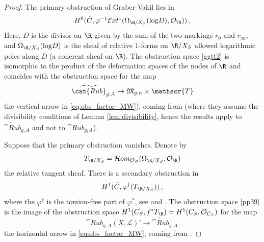 \documentclass[a4paper,12pt]{article} %
\newcommand{\MWvone}[1]{}%
\newcommand{\MWref}[1]{#1}
\newcommand{\cl}[1]{{\mathscr{#1}}}
\newcommand{\ca}[1]{{\mathcal{#1}}}
\def\log{\mathrm{log}}
\def\sheafhom{\mathcal{H}om}
\theoremstyle{definition}
\theoremstyle{plain}%
\renewcommand{\phi}{\varphi}
\newcommand{\jocomment}[1]{}
\begin{document}
\begin{proof}
The primary obstruction of Graber-Vakil lies in 
\begin{equation}\label{ggtt2}
H^0(\tilde C, \phi^{-1}\ca{E}xt^1(\Omega_{\R/X_S}(\log D), \ca O_{\R}))\, .
\end{equation}
Here, $D$ is the divisor on $\R$ given by the sum of the two markings $r_0$ and $r_\infty$, and $\Omega_{\R/X_S}(\log D)$ is the sheaf of relative 1-forms on $\R/X_S$ allowed logarithmic poles along $D$ (a coherent sheaf on $\R$). The obstruction space 
\eqref{ggtt2}
is isomorphic to the product of the deformation spaces of the nodes of $\R$
and coincides with the obstruction space
for the map $$\widetilde{\cat{Rub}}_{g,A} \to \frak M_{g,n} \times \cl T$$ the vertical arrow in \eqref{eq:obs_factor_MW}), coming from \cite[Proposition \MWref{5.6.5.3}\MWvone{5.20}]{Marcus2017Logarithmic-com} (where they assume the divisibility conditions of Lemma \ref{lem:divisibility}, hence the results apply to $\widetilde{\cat{Rub}}_{g, A}$ and not to $\cat{Rub}_{g, A}$). 

Suppose that the primary obstruction vanishes. Denote by $$T_{\R/X_S} = \sheafhom_{\ca O_{\R}}(\Omega_{\R/X_S} , \ca O_{\R})$$ the relative tangent sheaf. There is a secondary obstruction in 
\begin{equation}\label{pp39}
H^1(\tilde{C}, \phi^{\dagger}(T_{\R/X_S}))\,, 
\end{equation}
where the $\phi^{\dagger}$ is the torsion-free part of $\phi^*$, see \cite{Graber2005Relative-virtua} and \cite{Marcus2017Logarithmic-com}. The
obstruction space \eqref{pp39}
is the image of the obstruction space $H^1 (C_S, f^* T_\R ) = H^1(C_S, \ca O_{C_S})$ for the map $$\cat{Rub}_{g,A}(X, \ca L)' \to \widetilde{\cat{Rub}}_{g,A}\, $$
the horizontal arrow in \eqref{eq:obs_factor_MW}, coming from \cite[Proposition \MWref{5.6.3.1}\MWvone{5.17}]{Marcus2017Logarithmic-com}. 





\end{proof}
\end{document}
